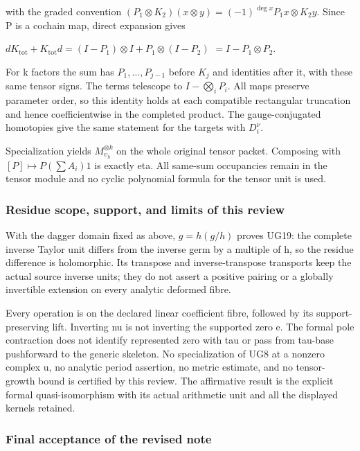 with the graded convention \((P_1\otimes K_2)(x\otimes y)=(-1)^{\deg x}P_1x\otimes K_2y\). Since P is a cochain map, direct expansion gives

\(dK_{\mathrm{tot}}+K_{\mathrm{tot}}d=(I-P_1)\otimes I+P_1\otimes(I-P_2)\) \(=I-P_1\otimes P_2\).

For k factors the sum has \(P_1,\ldots,P_{j-1}\) before \(K_j\) and identities after it, with these same tensor signs. The terms telescope to \(I-\bigotimes_i P_i\). All maps preserve parameter order, so this identity holds at each compatible rectangular truncation and hence coefficientwise in the completed product. The gauge-conjugated homotopies give the same statement for the targets with \(D_i^\nu\).

Specialization yields \(M_{\upsilon_h}^{\otimes k}\) on the whole original tensor packet. Composing with \([P]\mapsto P(\sum A_i)1\) is exactly eta. All same-sum occupancies remain in the tensor module and no cyclic polynomial formula for the tensor unit is used.

\subsubsection{Residue scope, support, and limits of this review}\label{endpoint-f1_unit_gauge_review--residue-scope-support-and-limits-of-this-review}

With the dagger domain fixed as above, \(g=h(g/h)\) proves UG19: the complete inverse Taylor unit differs from the inverse germ by a multiple of h, so the residue difference is holomorphic. Its transpose and inverse-transpose transports keep the actual source inverse units; they do not assert a positive pairing or a globally invertible extension on every analytic deformed fibre.

Every operation is on the declared linear coefficient fibre, followed by its support-preserving lift. Inverting nu is not inverting the supported zero e. The formal pole contraction does not identify represented zero with tau or pass from tau-base pushforward to the generic skeleton. No specialization of UG8 at a nonzero complex u, no analytic period assertion, no metric estimate, and no tensor-growth bound is certified by this review. The affirmative result is the explicit formal quasi-isomorphism with its actual arithmetic unit and all the displayed kernels retained.

\subsubsection{Final acceptance of the revised note}\label{endpoint-f1_unit_gauge_review--final-acceptance-of-the-revised-note}

